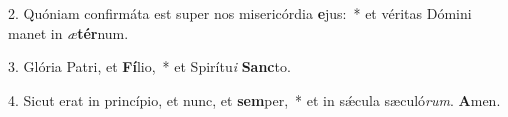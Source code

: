 2. Quóniam confirmáta est super nos misericórdia \textbf{e}jus:~*  et véritas Dómini manet in \textit{æ}\textbf{tér}num.\

3. Glória Patri, et \textbf{Fí}lio,~*  et Spirítu\textit{i} \textbf{Sanc}to.\

4. Sicut erat in princípio, et nunc, et \textbf{sem}per,~*  et in sǽcula sæculó\textit{rum}. \textbf{A}men.\

